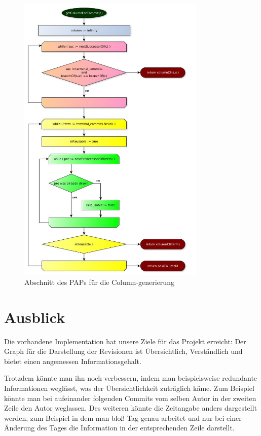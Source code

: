 \documentclass[color, ddc]{tudscrreprt}
\begin{document}
\begin{figure}[ht!]
\centering
\includegraphics[width=0.8\textwidth]{Skizzen/PAP_getColumnForCommit.jpg}
\caption{Abschnitt des PAPs für die Column-generierung}
\label{pap-column-img}
\end{figure}

\section{Ausblick}

Die vorhandene Implementation hat unsere Ziele für das Projekt erreicht: Der Graph für die Darstellung der Revisionen ist  Übersichtlich, Verständlich und bietet einen angemessen Informationsgehalt.

Trotzdem könnte man ihn noch verbessern, indem man beispielsweise redundante Informationen weglässt, was der Übersichtlichkeit zuträglich käme. Zum Beispiel könnte man bei aufeinander folgenden Commits vom selben Autor in der zweiten Zeile den Autor weglassen. Des weiteren könnte die Zeitangabe anders dargestellt werden, zum Beispiel in dem man bloß Tag-genau arbeitet und nur bei einer Änderung des Tages die Information in der entsprechenden Zeile darstellt.



\end{document}
